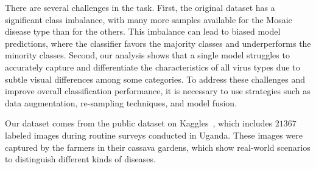 There are several challenges in the task. First, the original dataset has a significant class imbalance, with many more samples available for the Mosaic disease type than for the others. This imbalance can lead to biased model predictions, where the classifier favors the majority classes and underperforms the minority classes. Second, our analysis shows that a single model struggles to accurately capture and differentiate the characteristics of all virus types due to subtle visual differences among some categories. To address these challenges and improve overall classification performance, it is necessary to use strategies such as data augmentation, re-sampling techniques, and model fusion. 

Our dataset comes from the public dataset on Kaggles~\cite{cassava-leaf-disease-classification}, which includes $21367$ labeled images during routine surveys conducted in Uganda. These images were captured by the farmers in their cassava gardens, which show real-world scenarios to distinguish different kinds of diseases.